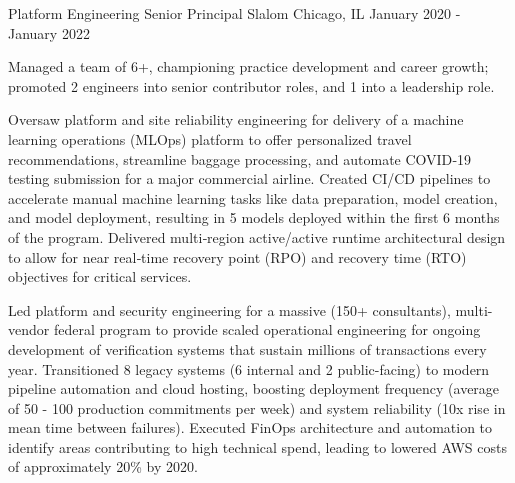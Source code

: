 \begin{cventries}
  \cventry
    {Platform Engineering Senior Principal} %
    {Slalom} %
    {Chicago, IL} %
    {January 2020 - January 2022} %
    {
      \begin{cvitems} %
        \item {Managed a team of 6+, championing practice development and career growth; promoted 2 engineers into senior contributor roles, and 1 into a leadership role.}
        \item {Oversaw platform and site reliability engineering for delivery of a machine learning operations (MLOps) platform to offer personalized travel recommendations, streamline baggage processing, and automate COVID‑19 testing submission for a major commercial airline. Created CI/CD pipelines to accelerate manual machine learning tasks like data preparation, model creation, and model deployment, resulting in 5 models deployed within the first 6 months of the program. Delivered multi‑region active/active runtime architectural design to allow for near real‑time recovery point (RPO) and recovery time (RTO) objectives for critical services.}
        \item {Led platform and security engineering for a massive (150+ consultants), multi-vendor federal program to provide scaled operational engineering for ongoing development of verification systems that sustain millions of transactions every year. Transitioned 8 legacy systems (6 internal and 2 public-facing) to modern pipeline automation and cloud hosting, boosting deployment frequency (average of 50 - 100 production commitments per week) and system reliability (10x rise in mean time between failures). Executed FinOps architecture and automation to identify areas contributing to high technical spend, leading to lowered AWS costs of approximately 20\% by 2020.}
      \end{cvitems}
    }


\end{cventries}

